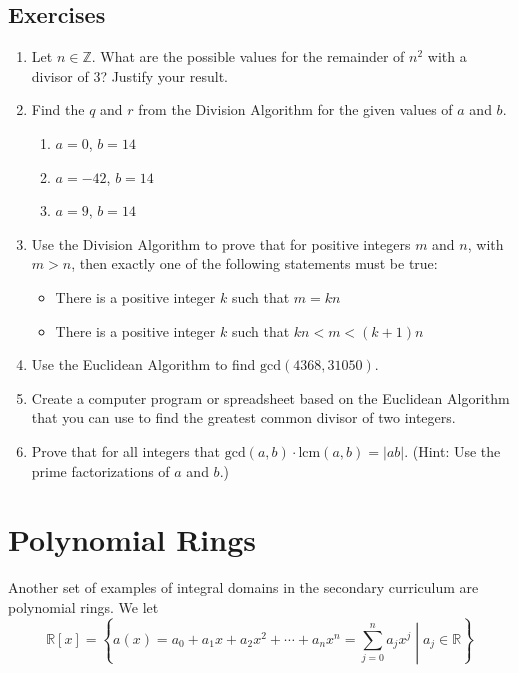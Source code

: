 \documentclass[
]{book}
\providecommand{\tightlist}{%
  \setlength{\itemsep}{0pt}\setlength{\parskip}{0pt}}
\theoremstyle{definition}
\theoremstyle{definition}
\theoremstyle{definition}
\theoremstyle{definition}
\theoremstyle{remark}
\begin{document}
\hypertarget{exercises-23}{%
\subsection{Exercises}\label{exercises-23}}

\begin{enumerate}
\def\labelenumi{\arabic{enumi}.}
\item
  Let \(n\in \mathbb{Z}\). What are the possible values for the remainder of \(n^2\) with a divisor of \(3\)? Justify your result.
\item
  Find the \(q\) and \(r\) from the Division Algorithm for the given values of \(a\) and \(b\).

  \begin{enumerate}
  \def\labelenumii{\alph{enumii}.}
  \tightlist
  \item
    \(a=0\), \(b=14\)
  \item
    \(a=-42\), \(b=14\)
  \item
    \(a=9\), \(b=14\)
  \end{enumerate}
\item
  Use the Division Algorithm to prove that for positive integers \(m\) and \(n\), with \(m > n\), then exactly one of the following statements must be true:

  \begin{itemize}
  \tightlist
  \item
    There is a positive integer \(k\) such that \(m = kn\)
  \item
    There is a positive integer \(k\) such that \(kn < m < (k + 1)n\)
  \end{itemize}
\item
  Use the Euclidean Algorithm to find \(\mathrm{gcd}(4368,31050)\).
\item
  Create a computer program or spreadsheet based on the Euclidean Algorithm that you can use to find the greatest common divisor of two integers.
\item
  Prove that for all integers that \(\mathrm{gcd}(a,b)\cdot \mathrm{lcm}(a,b) = |ab|\). (Hint: Use the prime factorizations of \(a\) and \(b\).)
\end{enumerate}

\hypertarget{polynomial-rings}{%
\section{Polynomial Rings}\label{polynomial-rings}}

Another set of examples of integral domains in the secondary curriculum are polynomial rings. We let \[\mathbb{R}[x]= \left\{ a(x)=a_0 + a_1 x + a_2 x^2 + \cdots + a_n x^n =\sum_{j=0}^n a_j x^j  \middle \vert a_j \in \mathbb{R} \right\}\]
\end{document}
